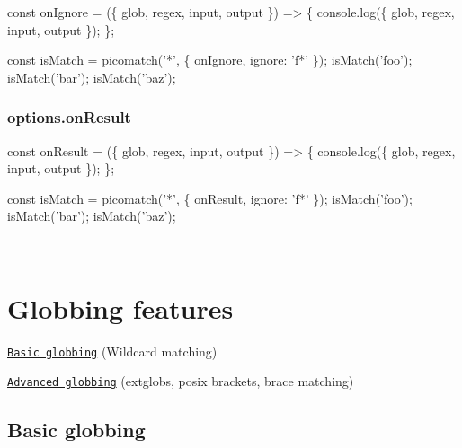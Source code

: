 \begin{DoxyCode}
const onIgnore = (\{ glob, regex, input, output \}) => \{
  console.log(\{ glob, regex, input, output \});
\};

const isMatch = picomatch('*', \{ onIgnore, ignore: 'f*' \});
isMatch('foo');
isMatch('bar');
isMatch('baz');
\end{DoxyCode}


\subsubsection*{options.\+on\+Result}


\begin{DoxyCode}
const onResult = (\{ glob, regex, input, output \}) => \{
  console.log(\{ glob, regex, input, output \});
\};

const isMatch = picomatch('*', \{ onResult, ignore: 'f*' \});
isMatch('foo');
isMatch('bar');
isMatch('baz');
\end{DoxyCode}


~\newline
 ~\newline


\section*{Globbing features}


\begin{DoxyItemize}
\item \href{#basic-globbing}{\tt Basic globbing} (Wildcard matching)
\item \href{#advanced-globbing}{\tt Advanced globbing} (extglobs, posix brackets, brace matching)
\end{DoxyItemize}

\subsection*{Basic globbing}

